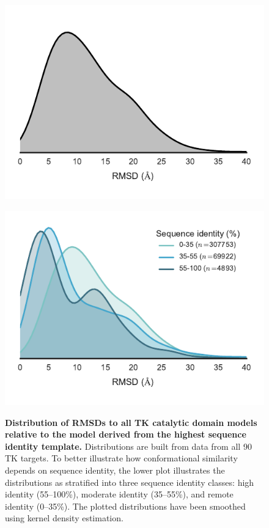 \documentclass[aps,pre,twocolumn,nofootinbib,superscriptaddress,linenumbers]{revtex4-1}
\begin{document}
\begin{figure}[tbp]
    \centering
    {\label{figure:rmsd-distribution-joint}%
       \includegraphics[height=0.6\textwidth]{rmsddist/rmsddist2-joint.pdf}
    }

    {\label{figure:rmsd-distribution-by-sequence-identity}%
       \includegraphics[height=0.6\textwidth]{rmsddist/rmsddist2.pdf}
    }

    \caption{{\bf Distribution of RMSDs to all TK catalytic domain models relative to the model derived from the highest sequence identity template.}    
    Distributions are built from data from all 90 TK targets.
    To better illustrate how conformational similarity depends on sequence identity, the lower plot illustrates the distributions as stratified into three sequence identity classes: high identity (55--100\%), moderate identity (35--55\%), and remote identity (0--35\%).
    The plotted distributions have been smoothed using kernel density estimation.
  }
  \label{figure:rmsd-distributions}
\end{figure}
\end{document}
